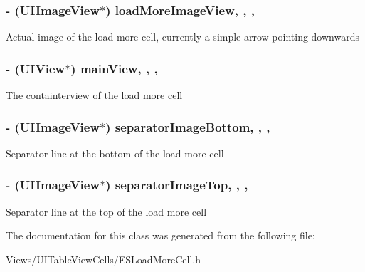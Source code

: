 \subsubsection[{load\+More\+Image\+View}]{\setlength{\rightskip}{0pt plus 5cm}-\/ (U\+I\+Image\+View$\ast$) load\+More\+Image\+View\hspace{0.3cm}{\ttfamily [read]}, {\ttfamily [write]}, {\ttfamily [nonatomic]}, {\ttfamily [strong]}}\label{interface_e_s_load_more_cell_a4ff0d702591f9ee73be8c3a609b03797}
Actual image of the load more cell, currently a simple arrow pointing downwards \hypertarget{interface_e_s_load_more_cell_a8c3e6cef63148acdf95681df8a1dbb78}{}
\subsubsection[{main\+View}]{\setlength{\rightskip}{0pt plus 5cm}-\/ (U\+I\+View$\ast$) main\+View\hspace{0.3cm}{\ttfamily [read]}, {\ttfamily [write]}, {\ttfamily [nonatomic]}, {\ttfamily [strong]}}\label{interface_e_s_load_more_cell_a8c3e6cef63148acdf95681df8a1dbb78}
The containterview of the load more cell \hypertarget{interface_e_s_load_more_cell_aba6622fe50f0d306173f202efbf8419a}{}
\subsubsection[{separator\+Image\+Bottom}]{\setlength{\rightskip}{0pt plus 5cm}-\/ (U\+I\+Image\+View$\ast$) separator\+Image\+Bottom\hspace{0.3cm}{\ttfamily [read]}, {\ttfamily [write]}, {\ttfamily [nonatomic]}, {\ttfamily [strong]}}\label{interface_e_s_load_more_cell_aba6622fe50f0d306173f202efbf8419a}
Separator line at the bottom of the load more cell \hypertarget{interface_e_s_load_more_cell_a41e315f2b8ff094f83b7584578595748}{}
\subsubsection[{separator\+Image\+Top}]{\setlength{\rightskip}{0pt plus 5cm}-\/ (U\+I\+Image\+View$\ast$) separator\+Image\+Top\hspace{0.3cm}{\ttfamily [read]}, {\ttfamily [write]}, {\ttfamily [nonatomic]}, {\ttfamily [strong]}}\label{interface_e_s_load_more_cell_a41e315f2b8ff094f83b7584578595748}
Separator line at the top of the load more cell 

The documentation for this class was generated from the following file\+:\begin{DoxyCompactItemize}
\item 
Views/\+U\+I\+Table\+View\+Cells/E\+S\+Load\+More\+Cell.\+h\end{DoxyCompactItemize}
